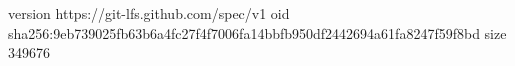 version https://git-lfs.github.com/spec/v1
oid sha256:9eb739025fb63b6a4fc27f4f7006fa14bbfb950df2442694a61fa8247f59f8bd
size 349676
